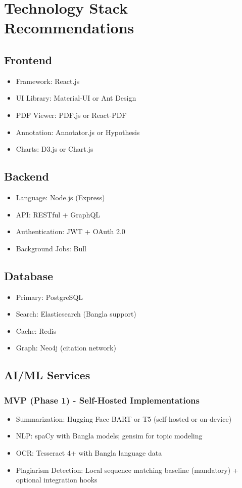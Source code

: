\documentclass[12pt,a4paper]{report}
\begin{document}
\section{Technology Stack Recommendations}

\subsection{Frontend}
\begin{itemize}
    \item Framework: React.js 
    \item UI Library: Material-UI or Ant Design
    \item PDF Viewer: PDF.js or React-PDF
    \item Annotation: Annotator.js or Hypothesis
    \item Charts: D3.js or Chart.js
\end{itemize}

\subsection{Backend}
\begin{itemize}
    \item Language: Node.js (Express) 
    \item API: RESTful + GraphQL
    \item Authentication: JWT + OAuth 2.0 
    \item Background Jobs: Bull 
\end{itemize}

\subsection{Database}
\begin{itemize}
    \item Primary: PostgreSQL
    \item Search: Elasticsearch (Bangla support)
    \item Cache: Redis
    \item Graph: Neo4j (citation network)
\end{itemize}

\subsection{AI/ML Services}
\subsubsection{MVP (Phase 1) - Self-Hosted Implementations}
\begin{itemize}
    \item Summarization: Hugging Face BART or T5 (self-hosted or on-device)
    \item NLP: spaCy with Bangla models; gensim for topic modeling
    \item OCR: Tesseract 4+ with Bangla language data
    \item Plagiarism Detection: Local sequence matching baseline (mandatory) + optional integration hooks
\end{itemize}
\end{document}
